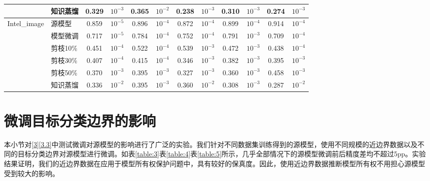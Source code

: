 \begin{table}[H]
{\begin{tabular}{l l c c c c c c c c c c}
								&知识蒸馏  & 0.329 & $10^{-3}$ & 0.365 & $10^{-2}$ & 0.238 & $10^{-3}$ & 0.310 & $10^{-3}$ & 0.274 & $10^{-3}$   \\
		\hline
\multirow{6}{5em}{Intel\_image} &源模型    & 0.859 & $10^{-5}$ & 0.896 & $10^{-4}$ & 0.872 & $10^{-4}$ & 0.899 & $10^{-4}$ & 0.914 & $10^{-4}$   \\
								&模型微调  & 0.717 & $10^{-5}$ & 0.784 & $10^{-4}$ & 0.752 & $10^{-4}$ & 0.791 & $10^{-3}$ & 0.709 & $10^{-4}$   \\
								&剪枝10\%  & 0.451 & $10^{-4}$ & 0.522 & $10^{-4}$ & 0.539 & $10^{-3}$ & 0.472 & $10^{-3}$ & 0.438 & $10^{-4}$   \\
								&剪枝30\%  & 0.407 & $10^{-4}$ & 0.415 & $10^{-4}$ & 0.346 & $10^{-3}$ & 0.382 & $10^{-3}$ & 0.395 & $10^{-3}$   \\
								&剪枝50\%  & 0.370 & $10^{-3}$ & 0.395 & $10^{-3}$ & 0.327 & $10^{-3}$ & 0.360 & $10^{-3}$ & 0.458 & $10^{-3}$   \\
								&知识蒸馏  & 0.336 & $10^{-2}$ & 0.395 & $10^{-3}$ & 0.360 & $10^{-2}$ & 0.308 & $10^{-3}$ & 0.287 & $10^{-2}$   \\
		\hline		
	\end{tabular}
}
\end{table}



\section{微调目标分类边界的影响}\label{5.5}

本小节对\ref{3}\ref{3.3}中测试微调对源模型的影响进行了广泛的实验。我们针对不同数据集训练得到的源模型，使用不同规模的近边界数据以及不同的目标分类边界对源模型进行微调。如表\ref{table:3}表\ref{table:4}表\ref{table:5}所示，几乎全部情况下的源模型微调前后精度差均不超过5pp。实验结果证明，我们的近边界数据在应用于模型所有权保护问题中，具有较好的保真度。因此，使用近边界数据推断模型所有权不用担心源模型受到较大的影响。

